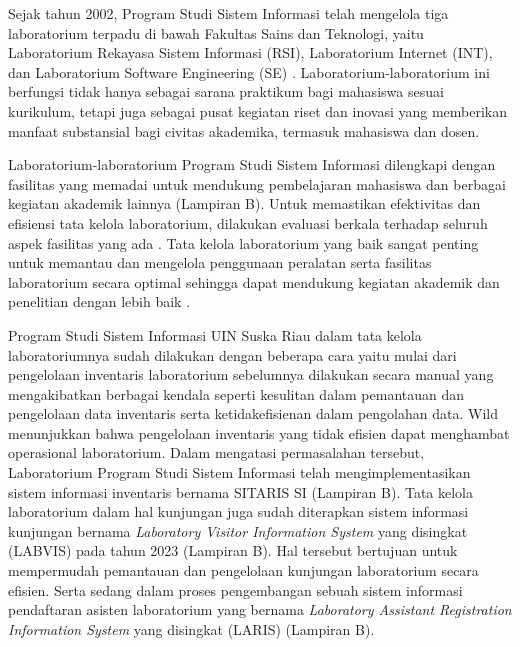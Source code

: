 Sejak tahun 2002, Program Studi Sistem Informasi telah mengelola tiga laboratorium terpadu di bawah Fakultas Sains dan Teknologi, yaitu Laboratorium Rekayasa Sistem Informasi (RSI), Laboratorium Internet (INT), dan Laboratorium Software Engineering (SE) \cite{lab-si-website}. Laboratorium-laboratorium ini berfungsi tidak hanya sebagai sarana praktikum bagi mahasiswa sesuai kurikulum, tetapi juga sebagai pusat kegiatan riset dan inovasi yang memberikan manfaat substansial bagi civitas akademika, termasuk mahasiswa dan dosen.

Laboratorium-laboratorium Program Studi Sistem Informasi dilengkapi dengan fasilitas yang memadai untuk mendukung pembelajaran mahasiswa dan berbagai kegiatan akademik lainnya (Lampiran B). Untuk memastikan efektivitas dan efisiensi tata kelola laboratorium, dilakukan evaluasi berkala terhadap seluruh aspek fasilitas yang ada \cite{lab-si-website}. Tata kelola laboratorium yang baik sangat penting untuk memantau dan mengelola penggunaan peralatan serta fasilitas laboratorium secara optimal sehingga dapat mendukung kegiatan akademik dan penelitian dengan lebih baik \cite{dongapure2024good}.

Program Studi Sistem Informasi UIN Suska Riau dalam tata kelola laboratoriumnya sudah dilakukan dengan beberapa cara yaitu mulai dari pengelolaan inventaris laboratorium sebelumnya dilakukan secara manual yang mengakibatkan berbagai kendala seperti kesulitan dalam pemantauan dan pengelolaan data inventaris serta ketidakefisienan dalam pengolahan data. Wild \citeyear{smith2021agile} menunjukkan bahwa pengelolaan inventaris yang tidak efisien dapat menghambat operasional laboratorium. Dalam mengatasi permasalahan tersebut, Laboratorium Program Studi Sistem Informasi telah mengimplementasikan sistem informasi inventaris bernama SITARIS SI (Lampiran B). Tata kelola laboratorium dalam hal kunjungan juga sudah diterapkan sistem informasi kunjungan bernama \textit{Laboratory Visitor Information System} yang disingkat (LABVIS) pada tahun 2023 (Lampiran B). Hal tersebut bertujuan untuk mempermudah pemantauan dan pengelolaan kunjungan laboratorium secara efisien. Serta sedang dalam proses pengembangan sebuah sistem informasi pendaftaran asisten laboratorium yang bernama \textit{Laboratory Assistant Registration Information System} yang disingkat (LARIS) (Lampiran B).


